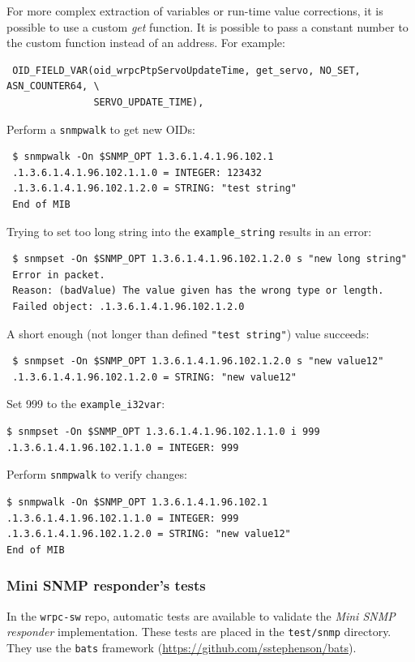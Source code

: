 \documentclass[a4paper, 12pt]{article}
\begin{document}
\begin{itemize*}
For more complex extraction of variables or run-time value corrections,
it is possible to use a custom \textit{get} function. It is possible to pass
a constant number to the custom function instead of an address. For example:
\begin{lstlisting}
 OID_FIELD_VAR(oid_wrpcPtpServoUpdateTime, get_servo, NO_SET, ASN_COUNTER64, \
               SERVO_UPDATE_TIME),
\end{lstlisting}

\end{itemize*}
Perform a \texttt{snmpwalk} to get new OIDs:
\begin{lstlisting}
 $ snmpwalk -On $SNMP_OPT 1.3.6.1.4.1.96.102.1
 .1.3.6.1.4.1.96.102.1.1.0 = INTEGER: 123432
 .1.3.6.1.4.1.96.102.1.2.0 = STRING: "test string"
 End of MIB
\end{lstlisting}
Trying to set too long string into the \texttt{example\_string} results in an error:
\begin{lstlisting}
 $ snmpset -On $SNMP_OPT 1.3.6.1.4.1.96.102.1.2.0 s "new long string"
 Error in packet.
 Reason: (badValue) The value given has the wrong type or length.
 Failed object: .1.3.6.1.4.1.96.102.1.2.0
\end{lstlisting}
A short enough (not longer than defined \texttt{"test string"}) value succeeds:
\begin{lstlisting}
 $ snmpset -On $SNMP_OPT 1.3.6.1.4.1.96.102.1.2.0 s "new value12"
 .1.3.6.1.4.1.96.102.1.2.0 = STRING: "new value12"
\end{lstlisting}
Set 999 to the \texttt{example\_i32var}:
\begin{lstlisting}
$ snmpset -On $SNMP_OPT 1.3.6.1.4.1.96.102.1.1.0 i 999
.1.3.6.1.4.1.96.102.1.1.0 = INTEGER: 999
\end{lstlisting}
Perform \texttt{snmpwalk} to verify changes:
\begin{lstlisting}
$ snmpwalk -On $SNMP_OPT 1.3.6.1.4.1.96.102.1
.1.3.6.1.4.1.96.102.1.1.0 = INTEGER: 999
.1.3.6.1.4.1.96.102.1.2.0 = STRING: "new value12"
End of MIB
\end{lstlisting}

\subsubsection{Mini SNMP responder's tests}
\label{Mini SNMP responder's tests}

In the \texttt{wrpc-sw} repo, automatic tests are available to validate the \textit{Mini
SNMP responder} implementation. These tests are placed in the \texttt{test/snmp}
directory.
They use the \texttt{bats} framework (\url{https://github.com/sstephenson/bats}).
\end{document}
